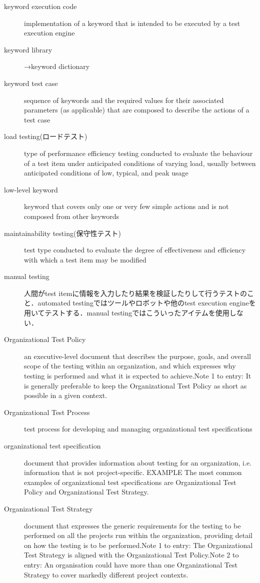 \begin{description}
    \item[keyword execution code]implementation of a keyword that is intended to be executed by a test execution engine
    \item[keyword library]→keyword dictionary
    \item[keyword test case]sequence of keywords and the required values for their associated parameters (as applicable) that are composed to describe the actions of a test case
    \item[load testing(ロードテスト)]type of performance efficiency testing conducted to evaluate the behaviour of a test item under anticipated conditions of varying load, usually between anticipated conditions of low, typical, and peak usage
    \item[low-level keyword]keyword that covers only one or very few simple actions and is not composed from other keywords
    \item[maintainability testing(保守性テスト)]test type conducted to evaluate the degree of effectiveness and efficiency with which a test item may be modified
    \item[manual testing]人間がtest itemに情報を入力したり結果を検証したりして行うテストのこと．automated testingではツールやロボットや他のtest execution engineを用いてテストする．manual testingではこういったアイテムを使用しない．
    \item[Organizational Test Policy]an executive-level document that describes the purpose, goals, and overall scope of the testing within an organization, and which expresses why testing is performed and what it is expected to achieve.Note 1 to entry: It is generally preferable to keep the Organizational Test Policy as short as possible in a given context.
    \item[Organizational Test Process]test process for developing and managing organizational test specifications
    \item[organizational test specification]document that provides information about testing for an organization, i.e. information that is not project-specific. EXAMPLE The most common examples of organizational test specifications are Organizational Test Policy and Organizational Test Strategy.
    \item[Organizational Test Strategy]document that expresses the generic requirements for the testing to be performed on all the projects run within the organization, providing detail on how the testing is to be performed.Note 1 to entry: The Organizational Test Strategy is aligned with the Organizational Test Policy.Note 2 to entry: An organisation could have more than one Organizational Test Strategy to cover markedly different project contexts.

\end{description}
